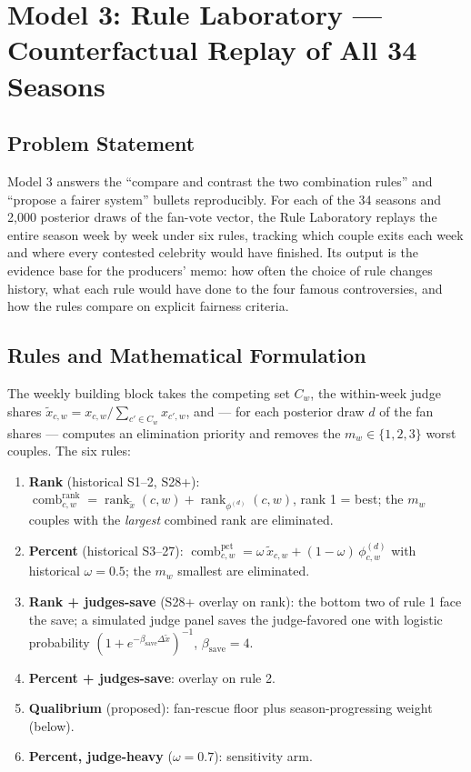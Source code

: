 \documentclass[11pt]{article}
\begin{document}
\section{Model 3: Rule Laboratory --- Counterfactual Replay of All 34 Seasons}
\label{sec:model3}

\subsection{Problem Statement}

Model 3 answers the ``compare and contrast the two combination rules'' and
``propose a fairer system'' bullets reproducibly. For each of the 34 seasons and
2{,}000 posterior draws of the fan-vote vector, the Rule Laboratory replays the
entire season week by week under six rules, tracking which couple exits each week
and where every contested celebrity would have finished. Its output is the
evidence base for the producers' memo: how often the choice of rule changes
history, what each rule would have done to the four famous controversies, and how
the rules compare on explicit fairness criteria.

\subsection{Rules and Mathematical Formulation}

The weekly building block takes the competing set $C_w$, the within-week judge
shares $\tilde x_{c,w} = x_{c,w}\big/\sum_{c'\in C_w} x_{c',w}$, and --- for each
posterior draw $d$ of the fan shares --- computes an elimination priority and
removes the $m_w \in \{1,2,3\}$ worst couples. The six rules:

\begin{enumerate}[leftmargin=2em]
\item \textbf{Rank} (historical S1--2, S28+):
$\operatorname{comb}^{\text{rank}}_{c,w} = \operatorname{rank}_{\tilde x}(c,w) +
\operatorname{rank}_{\phi^{(d)}}(c,w)$, rank 1 = best; the $m_w$ couples with the
\emph{largest} combined rank are eliminated.
\item \textbf{Percent} (historical S3--27):
$\operatorname{comb}^{\text{pct}}_{c,w} = \omega\,\tilde x_{c,w} + (1-\omega)\,
\phi^{(d)}_{c,w}$ with historical $\omega = 0.5$; the $m_w$ smallest are eliminated.
\item \textbf{Rank + judges-save} (S28+ overlay on rank): the bottom two of rule 1
face the save; a simulated judge panel saves the judge-favored one with logistic
probability $(1+e^{-\beta_{\text{save}}\Delta \tilde x})^{-1}$,
$\beta_{\text{save}} = 4$.
\item \textbf{Percent + judges-save}: overlay on rule 2.
\item \textbf{Qualibrium} (proposed): fan-rescue floor plus season-progressing
weight (below).
\item \textbf{Percent, judge-heavy} ($\omega = 0.7$): sensitivity arm.
\end{enumerate}
\end{document}
